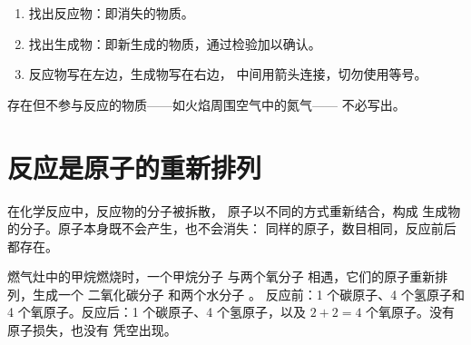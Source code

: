 \begin{method}[书写文字表达式]\label{met:g7:chemical-reactions:write}
\begin{enumerate}
  \item 找出反应物：即消失的物质。
  \item 找出生成物：即新生成的物质，通过检验加以确认。
  \item 反应物写在左边，生成物写在右边，
        中间用箭头连接，切勿使用等号。
\end{enumerate}
存在但不参与反应的物质——如火焰周围空气中的氮气——
不必写出。
\end{method}

\section{反应是原子的重新排列}

\begin{proposition}[原子被重新排列]\label{prop:g7:chemical-reactions:rearranged}
在化学反应中，反应物的分子被拆散，
原子以不同的方式重新结合，构成
生成物的分子。原子本身既不会产生，也不会消失：
同样的原子，数目相同，反应前后都存在。
\end{proposition}

\begin{example}[甲烷燃烧的分子变化]\label{ex:g7:chemical-reactions:methane}
燃气灶中的甲烷燃烧时，一个甲烷分子 
与两个氧分子  相遇，它们的原子重新排列，生成一个
二氧化碳分子  和两个水分子 。
反应前：1 个碳原子、4 个氢原子和 4 个氧原子。反应后：1 个碳原子、4
个氢原子，以及 $2 + 2 = 4$ 个氧原子。没有原子损失，也没有
凭空出现。
\end{example}

